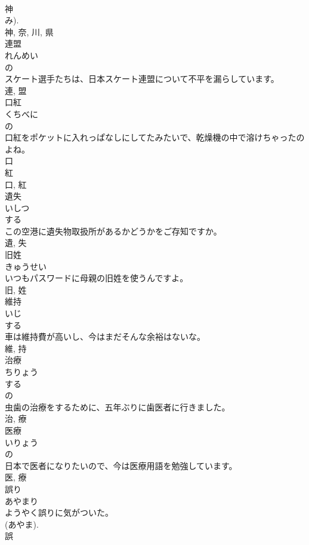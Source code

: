 \documentclass[8pt]{extreport}
\begin{document}
\begin{CJK}{UTF8}{min}
\\	神 
\\	み). 
\\	神, 奈, 川, 県	
\\	連盟	
\\	れんめい	
\\	の 
\\	スケート選手たちは、日本スケート連盟について不平を漏らしています。	
\\	連, 盟	
\\	口紅	
\\	くちべに	
\\	の 
\\	口紅をポケットに入れっぱなしにしてたみたいで、乾燥機の中で溶けちゃったのよね。	
\\	口 
\\	紅 
\\	口, 紅	
\\	遺失	
\\	いしつ	
\\	する 
\\	この空港に遺失物取扱所があるかどうかをご存知ですか。	
\\	遺, 失	
\\	旧姓	
\\	きゅうせい	
\\	いつもパスワードに母親の旧姓を使うんですよ。	
\\	旧, 姓	
\\	維持	
\\	いじ	
\\	する 
\\	車は維持費が高いし、今はまだそんな余裕はないな。	
\\	維, 持	
\\	治療	
\\	ちりょう	
\\	する 
\\	の 
\\	虫歯の治療をするために、五年ぶりに歯医者に行きました。	
\\	治, 療	
\\	医療	
\\	いりょう	
\\	の 
\\	日本で医者になりたいので、今は医療用語を勉強しています。	
\\	医, 療	
\\	誤り	
\\	あやまり	
\\	ようやく誤りに気がついた。	
\\	(あやま).
\\	誤	

\end{CJK}
\end{document}
